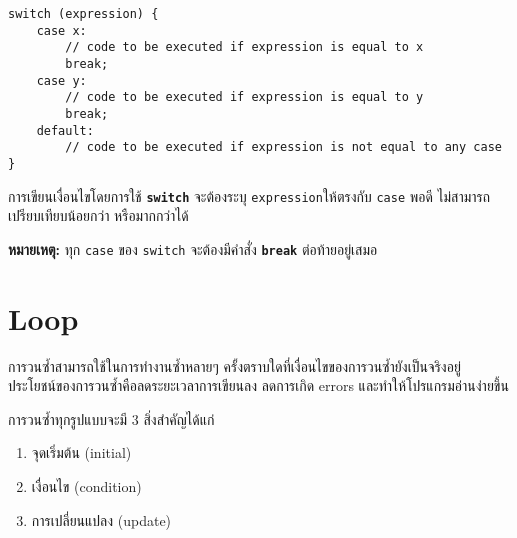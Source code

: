 \begin{lstlisting}
switch (expression) {
	case x:
    	// code to be executed if expression is equal to x
        break;
    case y:
    	// code to be executed if expression is equal to y
        break;
    default:
    	// code to be executed if expression is not equal to any case
}
\end{lstlisting}
การเขียนเงื่อนไขโดยการใช้ \textbf{\texttt{switch}} จะต้องระบุ \texttt{expression}ให้ตรงกับ \texttt{case} พอดี ไม่สามารถเปรียบเทียบน้อยกว่า หรือมากกว่าได้

\noindent\textbf{หมายเหตุ:} ทุก \texttt{case} ของ \texttt{switch} จะต้องมีคำสั่ง \textbf{\texttt{break}} ต่อท้ายอยู่เสมอ

\newpage
\section{Loop}
การวนซ้ำสามารถใช้ในการทำงานซ้ำหลายๆ ครั้งตราบใดที่เงื่อนไขของการวนซ้ำยังเป็นจริงอยู่ ประโยชน์ของการวนซ้ำคือลดระยะเวลาการเขียนลง ลดการเกิด errors และทำให้โปรแกรมอ่านง่ายขึ้น

การวนซ้ำทุกรูปแบบจะมี 3 สิ่งสำคัญได้แก่
\begin{enumerate}
\item จุดเริ่มต้น (initial)
\item เงื่อนไข (condition)
\item การเปลี่ยนแปลง (update)
\end{enumerate}

